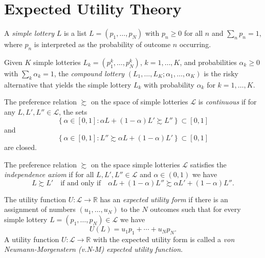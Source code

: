 \addtocounter{section}{1}

\section{Expected Utility Theory}

\begin{defn}
    A \emph{simple lottery} $L$ is a list $L = (p_1, \dots, p_N)$ with $p_n \geq 0$ for all $n$ and $\sum_n p_n = 1$, where $p_n$ is interpreted as the probability of outcome $n$ occurring.
\end{defn}

\begin{defn}
    Given $K$ simple lotteries $L_k = (p_1^k, \dots, p_N^k)$, $k = 1, \dots, K$, and probabilities $\alpha_k \geq 0$ with $\sum_k \alpha_k = 1$, the \emph{compound lottery} $(L_1, \dots, L_K; \alpha_1, \dots, \alpha_K)$ is the risky alternative that yields the simple lottery $L_k$ with probability $\alpha_k$ for $k = 1, \dots, K$.
\end{defn}

\begin{defn}
    The preference relation $\succsim$ on the space of simple lotteries $\mathscr{L}$ is \emph{continuous} if for any $L, L', L'' \in \mathscr{L}$, the sets
    \begin{equation*}
        \left\{ \alpha \in [0, 1]: \alpha L + (1 - \alpha) L' \succsim L'' \right\} \subset [0, 1]
    \end{equation*}
    and
    \begin{equation*}
        \left\{ \alpha \in [0, 1]: L'' \succsim \alpha L + (1 - \alpha) L' \right\} \subset [0, 1]
    \end{equation*}
    are closed.
\end{defn}

\begin{defn}
    The preference relation $\succsim$ on the space simple lotteries $\mathscr{L}$ satisfies the \emph{independence axiom} if for all $L, L', L'' \in \mathscr{L}$ and $\alpha \in (0, 1)$ we have
    \begin{equation*}
        L \succsim L' \quad \text{if and only if} \quad \alpha L + (1 - \alpha) L'' \succsim \alpha L' + (1 - \alpha) L''.
    \end{equation*}
\end{defn}

\begin{defn}
    The utility function $U : \mathscr{L} \rightarrow \mathbb{R}$ has an \emph{expected utility form} if there is an assignment of numbers $(u_1, \dots, u_N)$ to the $N$ outcomes such that for every simple lottery $L = (p_1, \dots, p_N) \in \mathscr{L}$ we have
    \begin{equation*}
        U(L) = u_1 p_1 + \cdots + u_N p_N.
    \end{equation*}
    A utility function $U : \mathscr{L} \rightarrow \mathbb{R}$ with the expected utility form is called a \emph{von Neumann-Morgenstern (v.N-M) expected utility function}.
\end{defn}

